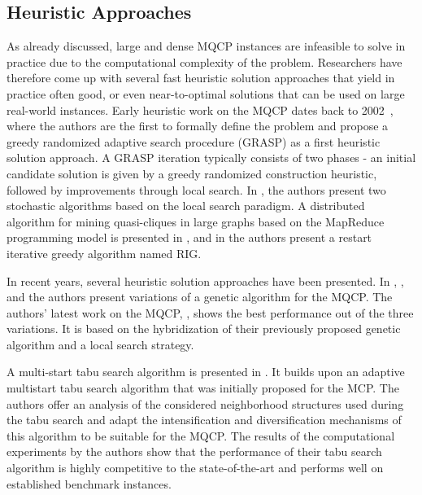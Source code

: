 \documentclass[draft,final]{vutinfth} %
\begin{document}
\subsection{Heuristic Approaches}

As already discussed, large and dense MQCP instances are infeasible to solve in practice due to the computational complexity of the problem. Researchers have therefore come up with several fast heuristic solution approaches that yield in practice often good, or even near-to-optimal solutions that can be used on large real-world instances. 
Early heuristic work on the MQCP dates back to 2002~\cite{Abello2002}, where the authors are the first to formally define the problem and propose a greedy randomized adaptive search procedure (GRASP) as a first heuristic solution approach. A GRASP iteration typically consists of two phases - an initial candidate solution is given by a greedy randomized construction heuristic, followed by improvements through local search. In \cite{Brunato2008}, the authors present two stochastic algorithms based on the local search paradigm. A distributed algorithm for mining quasi-cliques in large graphs based on the MapReduce programming model is presented in \cite{Khosraviani2011}, and in \cite{oliveira2013construction} the authors present a restart iterative greedy algorithm named RIG. 

In recent years, several heuristic solution approaches have been presented. In \cite{pinto2015biased}, \cite{pinto_biased_2018}, and \cite{pinto2021brkga} the authors present variations of a genetic algorithm for the MQCP. The authors' latest work on the MQCP, \cite{pinto2021brkga}, shows the best performance out of the three variations. It is based on the hybridization of their previously proposed genetic algorithm and a local search strategy. 

A multi-start tabu search algorithm is presented in \cite{djeddi_extension_2019}. It builds upon an adaptive multistart tabu search algorithm that was initially proposed for the MCP. The authors offer an analysis of the considered neighborhood structures used during the tabu search and adapt the intensification and diversification mechanisms of this algorithm to be suitable for the MQCP. The results of the computational experiments by the authors show that the performance of their tabu search algorithm is highly competitive to the state-of-the-art and performs well on established benchmark instances. 
\end{document}
